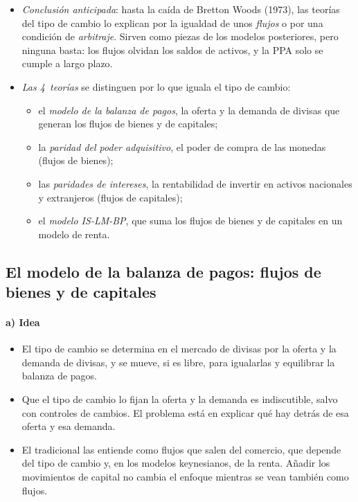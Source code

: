 \documentclass[11pt]{article}
\begin{document}
\begin{itemize}
\item \emph{Conclusión anticipada}: hasta la caída de Bretton Woods (1973), las teorías del tipo de cambio lo explican por la igualdad de unos \emph{flujos} o por una condición de \emph{arbitraje}. Sirven como piezas de los modelos posteriores, pero ninguna basta: los flujos olvidan los saldos de activos, y la PPA solo se cumple a largo plazo.
\item \emph{Las 4~teorías} se distinguen por lo que iguala el tipo de cambio:
  \begin{itemize}
  \item el \emph{modelo de la balanza de pagos}, la oferta y la demanda de divisas que generan los flujos de bienes y de capitales;
  \item la \emph{paridad del poder adquisitivo}, el poder de compra de las monedas (flujos de bienes);
  \item las \emph{paridades de intereses}, la rentabilidad de invertir en activos nacionales y extranjeros (flujos de capitales);
  \item el \emph{modelo IS-LM-BP}, que suma los flujos de bienes y de capitales en un modelo de renta.
  \end{itemize}
\end{itemize}

\subsection{El modelo de la balanza de pagos:\cortetitulo{} flujos de bienes y de capitales}\label{sec:balanza}

\paragraph{a) Idea}
\begin{itemize}
\item El tipo de cambio se determina en el mercado de divisas por la oferta y la demanda de divisas, y se mueve, si es libre, para igualarlas y equilibrar la balanza de pagos.
\item Que el tipo de cambio lo fijan la oferta y la demanda es indiscutible, salvo con controles de cambios. El problema está en explicar qué hay detrás de esa oferta y esa demanda.
\item El  tradicional las entiende como flujos que salen del comercio, que depende del tipo de cambio y, en los modelos keynesianos, de la renta. Añadir los movimientos de capital no cambia el enfoque mientras se vean también como flujos.
\end{itemize}
\end{document}
